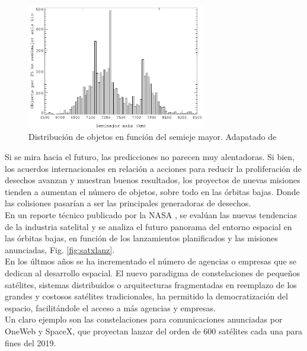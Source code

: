 \begin{figure}[!h]
  \centering
  \includegraphics[width=0.7\textwidth]{imagenes/SDvsaltura2011}
  \caption[Distribuci\'on de objetos en funci\'on del semieje mayor.]{Distribuci\'on de objetos en funci\'on del semieje mayor. Adapatado de \citep{Klinkrad}}
  \label{fig:Dvsaltura}
\end{figure}

Si se mira hacia el futuro, las predicciones no parecen muy alentadoras. Si bien, los acuerdos internacionales en relaci\'on a acciones para reducir la proliferaci\'on de desechos avanzan y muestran buenos resultados, los proyectos de nuevas misiones tienden a aumentan el n\'umero de objetos, sobre todo en las \'orbitas bajas. Donde las colisiones pasar\'ian a ser las principales generadoras de desechos.\\

En un reporte t\'ecnico publicado por la NASA \citep{karacalioglu2016impact}, se eval\'uan las nuevas tendencias de la industria satelital y se analiza el futuro panorama del entorno espacial en las \'orbitas bajas, en funci\'on de los lanzamientos planificados y las misiones anunciadas, Fig. \ref{fig:satxlanz}.\\

En los \'ultmos a\~nos se ha incrementado el n\'umero de agencias o empresas que se dedican al desarrollo espacial. El nuevo paradigma de constelaciones de peque\~nos sat\'elites, sistemas distribuidos o arquitecturas fragmentadas en reemplazo de los grandes y costosos sat\'elites tradicionales, ha permitido la democratizaci\'on del espacio, facilit\'andole el acceso a m\'as agencias y empresas.\\ 
Un claro ejemplo son las constelaciones para comunicaciones anunciadas por OneWeb y SpaceX, que proyectan lanzar del orden de 600 sat\'elites cada una para fines del 2019.\\


